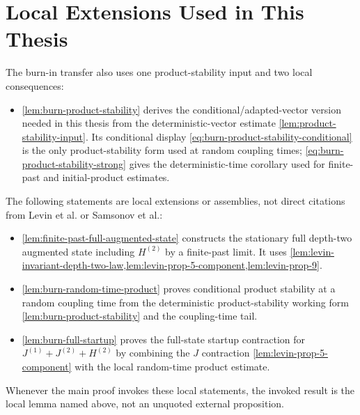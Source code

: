 \section{Local Extensions Used in This Thesis}\label{sec:external-local-extensions}

The burn-in transfer also uses one product-stability input and two local
consequences:

\begin{itemize}
\item \cref{lem:burn-product-stability} derives the conditional/adapted-vector
version needed in this thesis from the deterministic-vector estimate
\cref{lem:product-stability-input}. Its conditional display
\eqref{eq:burn-product-stability-conditional} is the only product-stability form
used at random coupling times; \eqref{eq:burn-product-stability-strong} gives
the deterministic-time corollary used for finite-past and initial-product
estimates.
\end{itemize}

The following statements are local extensions or assemblies, not direct
citations from Levin et al. or Samsonov et al.:

\begin{itemize}
\item \cref{lem:finite-past-full-augmented-state} constructs the stationary full
depth-two augmented state including $H^{(2)}$ by a finite-past limit. It uses
\cref{lem:levin-invariant-depth-two-law,lem:levin-prop-5-component,lem:levin-prop-9}.
\item \cref{lem:burn-random-time-product} proves conditional product stability
at a random coupling time from the deterministic product-stability working form
\cref{lem:burn-product-stability} and the coupling-time tail.
\item \cref{lem:burn-full-startup} proves the full-state startup contraction for
$J^{(1)}+J^{(2)}+H^{(2)}$ by combining the $J$ contraction
\cref{lem:levin-prop-5-component} with the local random-time product estimate.
\end{itemize}

Whenever the main proof invokes these local statements, the invoked result is
the local lemma named above, not an unquoted external proposition.
